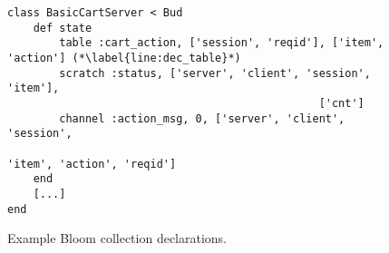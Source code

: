 \begin{comment}
\begin{figure}[t]
\begin{scriptsize}
\begin{verbatim}
 1      class SimplePQueue < Bud
 2      def state
 3        table :q, ['id'], ['payload']
 4        table :min_id, ['id']
 5        table :log, ['id'], ['payload']
 6        scratch :newmins, ['id'], ['payload']
 7        channel :output, 0, ['addr', 'id'], ['payload']
 8      end
 9    
10      declare
11      def dequeue
12        # find min_id value, agg across all items (group=nil)
13        min_id <= q.group(nil, min(q.id))
14    
15        # find the q items with min_id via natural join
16        mins = natjoin [q, min_id] {|q, m| q }
17    
18        # idempotence: ignore items with id previously logged
19        newmins <= mins.map do |q| 
20          q unless log.map{|p| p.id}.include? q.id
21        end
22
23        # in the next timestep, add newmins to log, delete from q
24        log <+ newmins.map{|h| [h.id]}
25        q <- mins.map {|q| q}
26      
27        # ship the min items via the output channel
28        output <+ mins.map{|q| ['192.168.1.1:12345'] + q}
29      end
30    end
\end{verbatim}
\vspace{-10pt}
\caption{Example Bloom code for dequeuing items from a priority queue.}
\label{fig:queue}
\end{scriptsize}
\vspace{-2pt}
\end{figure}

\end{comment}

\begin{figure}[t]
\begin{scriptsize}
\begin{lstlisting}
class BasicCartServer < Bud
	def state
		table :cart_action, ['session', 'reqid'], ['item', 'action'] (*\label{line:dec_table}*)
		scratch :status, ['server', 'client', 'session', 'item'],
												['cnt']
		channel :action_msg, 0, ['server', 'client', 'session',
																 'item', 'action', 'reqid']
	end
	[...]
end
\end{lstlisting}
\vspace{-10pt}
\caption{Example Bloom collection declarations.}
\label{fig:declarations}
\end{scriptsize}
\vspace{-2pt}
\end{figure}



